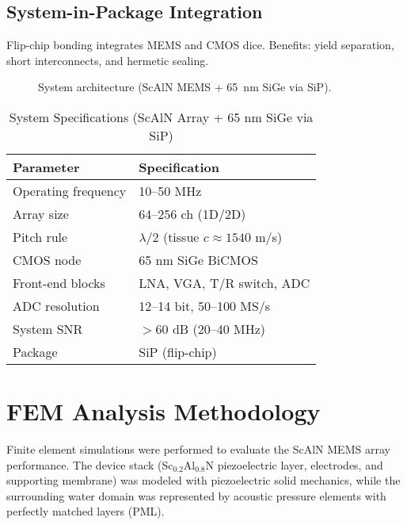 \documentclass[conference]{IEEEtran}
\begin{document}
\subsection{System-in-Package Integration}
Flip-chip bonding integrates MEMS and CMOS dice. Benefits: yield separation, short interconnects, and hermetic sealing.

\begin{figure}[!t]
\centering
{}
\caption{System architecture (ScAlN MEMS + 65~nm SiGe via SiP).}
\label{fig:arch}
\end{figure}

\begin{table}[!t]
\caption{System Specifications (ScAlN Array + 65 nm SiGe via SiP)}
\label{tab:spec}
\centering
\begin{tabular}{@{}ll@{}}
\toprule
\textbf{Parameter} & \textbf{Specification}\\
\midrule
Operating frequency & 10--50 MHz\\
Array size & 64--256 ch (1D/2D)\\
Pitch rule & $\lambda/2$ (tissue $c\!\approx\!1540$ m/s)\\
CMOS node & 65 nm SiGe BiCMOS\\
Front-end blocks & LNA, VGA, T/R switch, ADC\\
ADC resolution & 12--14 bit, 50--100 MS/s\\
System SNR & $>60$ dB (20--40 MHz)\\
Package & SiP (flip-chip)\\
\bottomrule
\end{tabular}
\end{table}

\section{FEM Analysis Methodology}
Finite element simulations were performed to evaluate the ScAlN MEMS array performance. The device stack (Sc$_{0.2}$Al$_{0.8}$N piezoelectric layer, electrodes, and supporting membrane) was modeled with piezoelectric solid mechanics, while the surrounding water domain was represented by acoustic pressure elements with perfectly matched layers (PML).
\end{document}
